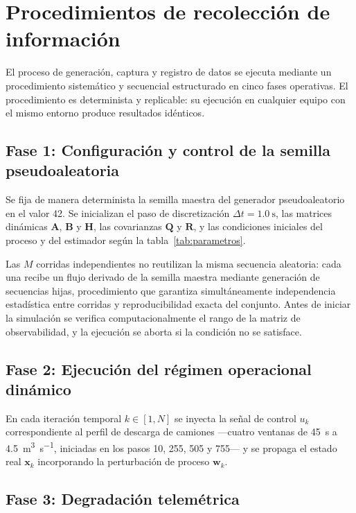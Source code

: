 \section{Procedimientos de recolección de información}
\label{sec:procedimientos}

El proceso de generación, captura y registro de datos se ejecuta mediante un
procedimiento sistemático y secuencial estructurado en cinco fases operativas.
El procedimiento es determinista y replicable: su ejecución en cualquier equipo
con el mismo entorno produce resultados idénticos.

\subsection{Fase 1: Configuración y control de la semilla pseudoaleatoria}

Se fija de manera determinista la semilla maestra del generador
pseudoaleatorio en el valor \num{42}. Se inicializan el paso de discretización
$\Delta t = \SI{1,0}{\second}$, las matrices dinámicas $\mathbf{A}$,
$\mathbf{B}$ y $\mathbf{H}$, las covarianzas $\mathbf{Q}$ y $\mathbf{R}$, y las
condiciones iniciales del proceso y del estimador según la
tabla~\ref{tab:parametros}.

Las $M$ corridas independientes no reutilizan la misma secuencia aleatoria: cada
una recibe un flujo derivado de la semilla maestra mediante generación de
secuencias hijas, procedimiento que garantiza simultáneamente independencia
estadística entre corridas y reproducibilidad exacta del conjunto. Antes de
iniciar la simulación se verifica computacionalmente el rango de la matriz de
observabilidad, y la ejecución se aborta si la condición no se satisface.

\subsection{Fase 2: Ejecución del régimen operacional dinámico}

En cada iteración temporal $k \in [1, N]$ se inyecta la señal de control
$u_{k}$ correspondiente al perfil de descarga de camiones —cuatro ventanas de
\SI{45}{\second} a \SI{4,5}{\metre\cubed\per\second}, iniciadas en los pasos
\num{10}, \num{255}, \num{505} y \num{755}— y se propaga el estado real
$\mathbf{x}_{k}$ incorporando la perturbación de proceso $\mathbf{w}_{k}$.

\subsection{Fase 3: Degradación telemétrica}

